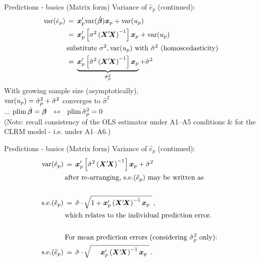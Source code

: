 \documentclass{beamer}
\begin{document}

\begin{frame}{Predictions - basics (Matrix form)}
Variance of $\hat{e}_p$ (continued):
\begin{equation*}
\begin{aligned}
\textnormal{var}(\hat{e}_p) \,&=\,
  \bm{x}_{p}^\prime \textnormal{var}(\hat{\bm{\beta}})\bm{x}_{p} + \textnormal{var}(u_p)\\
 \,&=\,
   \bm{x}_{p}^\prime \left[ \sigma^2 \left( \bm{X}^\prime \! \bm{X}  \right)^{-1} \right] \bm{x}_{p} + \textnormal{var}(u_p)\\
   & \textnormal{substitute $\sigma^2, \textnormal{var}(u_p)$ with $\hat{\sigma}^2$ (homoscedasticity)}\\
  \,&=\,
   \underbrace{\bm{x}_{p}^\prime \left[ \hat{\sigma}^2 \left( \bm{X}^\prime \! \bm{X}  \right)^{-1} \right] \bm{x}_{p}}_{\hat{\sigma}_p^2}
   + \hat{\sigma}^2
\end{aligned}
\end{equation*}
With growing sample size (asymptotically), \\
$\textnormal{var}(u_p) = \hat{\sigma}_p^2 + \hat{\sigma}^2$ converges to $\hat{\sigma}^2$\\
$\dots$ $\textnormal{plim} \, \hat{\bm{\beta}} = \bm{\beta} \,\,\,\, \leftrightarrow \,\,\,\, 
  \textnormal{plim} \, \hat{\sigma}_p^2 = 0$\\ \medskip
  (Note: recall consistency of the OLS estimator under A1--A5 conditions \& for the CLRM model - i.e. under A1--A6.)

\end{frame}

\begin{frame}{Predictions - basics (Matrix form)}
Variance of $\hat{e}_p$ (continued):
\begin{equation*}
\begin{aligned}
\textnormal{var}(\hat{e}_p) \,&=\,
\bm{x}_{p}^\prime \left[ \hat{\sigma}^2 \left( \bm{X}^\prime \! \bm{X}  \right)^{-1} \right] \bm{x}_{p}
   + \hat{\sigma}^2\\
   & \textnormal{after re-arranging, $\textnormal{s.e.}(\hat{e}_p)$ may be written as}\\
   &~\\
   \textnormal{s.e.}(\hat{e}_p) \,&=\, \hat{\sigma} \cdot \,  
   \sqrt[]{1+ \bm{x}_{p}^\prime \left( \bm{X}^\prime \! \bm{X}  \right)^{-1} \bm{x}_{p}~} \,,\\
   &\textnormal{which relates to the individual prediction error. }\\~&~\\
   &\textnormal{For mean prediction errors (considering $\hat{\sigma}_p^2$ only): }\\
   \textnormal{s.e.}(\widetilde{e}_p) \,&=\, \hat{\sigma} \cdot \,  
   \sqrt[]{~~~~ \bm{x}_{p}^\prime \left( \bm{X}^\prime \! \bm{X}  \right)^{-1} \bm{x}_{p}~} \,.\\
\end{aligned}
\end{equation*}

\end{frame}
\end{document}
